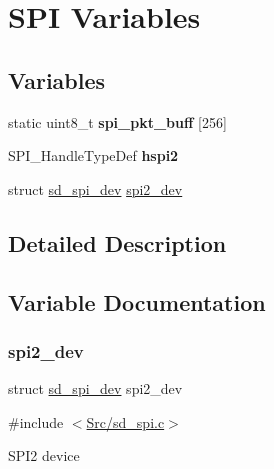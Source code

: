 \hypertarget{group___s_d___s_p_i___variables}{}\section{S\+PI Variables}
\label{group___s_d___s_p_i___variables}
\subsection*{Variables}
\begin{DoxyCompactItemize}
\item 
\mbox{\label{group___s_d___s_p_i___variables_gac43f462749b49987b81019227dd20f6c}} 
static uint8\+\_\+t {\bfseries spi\+\_\+pkt\+\_\+buff} \mbox{[}256\mbox{]}
\item 
\mbox{\label{group___s_d___s_p_i___variables_gab9da65f935e805137e2eb4e18c5ab224}} 
S\+P\+I\+\_\+\+Handle\+Type\+Def {\bfseries hspi2}
\item 
struct \mbox{\hyperlink{structsd__spi__dev}{sd\+\_\+spi\+\_\+dev}} \mbox{\hyperlink{group___s_d___s_p_i___variables_gadd51200449660601f797966b98b18211}{spi2\+\_\+dev}}
\end{DoxyCompactItemize}


\subsection{Detailed Description}


\subsection{Variable Documentation}
\mbox{\label{group___s_d___s_p_i___variables_gadd51200449660601f797966b98b18211}} 
\subsubsection{\texorpdfstring{spi2\+\_\+dev}{spi2\_dev}}
{\footnotesize\ttfamily struct \mbox{\hyperlink{structsd__spi__dev}{sd\+\_\+spi\+\_\+dev}} spi2\+\_\+dev}



{\ttfamily \#include $<$\mbox{\hyperlink{sd__spi_8c}{Src/sd\+\_\+spi.\+c}}$>$}

S\+P\+I2 device 